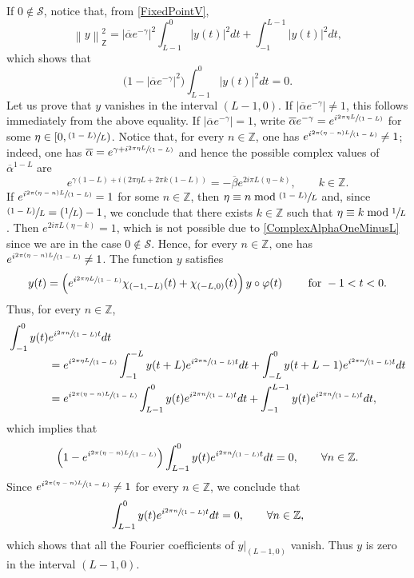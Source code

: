 \documentclass[10pt]{article}
\newcommand{\spfrac}[2]{\sfrac{#1}{(#2)}}
\newcommand{\psfrac}[2]{\sfrac{(#1)}{#2}}
\newcommand{\Psfrac}[2]{(\sfrac{#1}{#2})}
\theoremstyle{plain}
\theoremstyle{definition}
\newcommand{\norm}[1]{\left\lVert #1\right\lVert}
\newcommand{\abs}[1]{\left\lvert #1\right \rvert}
\numberwithin{equation}{section}\numberwithin{figure}{section}\emergencystretch=3em
\begin{document}
If $0 \notin \mathcal S$, notice that, from \eqref{FixedPointV},
\[
\norm{y}_{\mathsf Z}^2 = \abs{\overline\alpha e^{-\gamma}}^2 \int_{L-1}^{0} \abs{y(t)}^2 dt + \int_{-1}^{L - 1} \abs{y(t)}^2 dt,
\]
which shows that
\[
\bigl(1 - \abs{\overline\alpha e^{-\gamma}}^2\bigr) \int_{L-1}^{0} \abs{y(t)}^2 dt = 0.
\]
Let us prove that $y$ vanishes in the interval $(L - 1, 0)$. If $\abs{\overline\alpha e^{-\gamma}} \neq 1$, this follows immediately from the above equality. If $\abs{\overline\alpha e^{-\gamma}} = 1$, write $\overline\alpha e^{-\gamma} = e^{i \spfrac{2\pi\eta L}{1 - L}}$ for some $\eta \in \left[0, \psfrac{1-L}{L}\right)$. Notice that, for every $n \in \mathbb Z$, one has $e^{i \spfrac{2\pi(\eta - n) L}{1 - L}} \neq 1$; indeed, one has $\overline\alpha = e^{\gamma + i \spfrac{2\pi\eta L}{1 - L}}$ and hence the possible complex values of $\overline\alpha^{1-L}$ are
\begin{equation}
\label{ComplexAlphaOneMinusL}
e^{\gamma (1 - L) + i (2\pi\eta L + 2\pi k (1 - L))} = -\overline\beta e^{2 i \pi L (\eta - k)}, \qquad k \in \mathbb Z.
\end{equation}
If $e^{i \spfrac{2\pi(\eta - n) L}{1 - L}} = 1$ for some $n \in \mathbb Z$, then $\eta \equiv n \bmod \psfrac{1-L}{L}$ and, since $\psfrac{1-L}{L} = \Psfrac{1}{L} - 1$, we conclude that there exists $k \in \mathbb Z$ such that $\eta \equiv k \bmod \sfrac{1}{L}$. Then $e^{2 i \pi L (\eta - k)} = 1$, which is not possible due to \eqref{ComplexAlphaOneMinusL} since we are in the case $0 \notin \mathcal S$. Hence, for every $n \in \mathbb Z$, one has $e^{i \spfrac{2\pi(\eta - n) L}{1 - L}} \neq 1$. The function $y$ satisfies
\[
y(t) = \left(e^{i \spfrac{2\pi\eta L}{1 - L}} \chi_{(-1, -L)}(t) + \chi_{(-L, 0)}(t)\right) y \circ \varphi(t) \qquad \text{ for } -1 < t < 0.
\]
Thus, for every $n \in \mathbb Z$,
\begin{align*}
\int_{-1}^0 y(t) &e^{i \spfrac{2 \pi n}{1-L} t} dt\\[-5pt]
 & = e^{i \spfrac{2\pi\eta L}{1 - L}} \int_{-1}^{-L} y(t + L) e^{i \spfrac{2 \pi n}{1-L} t} dt + \int_{-L}^0 y(t + L - 1) e^{i \spfrac{2 \pi n}{1-L} t} dt \\
& = e^{i \spfrac{2\pi(\eta - n) L}{1 - L}} \int_{L-1}^{0} y(t) e^{i \spfrac{2 \pi n}{1-L} t} dt + \int_{-1}^{L - 1} y(t) e^{i \spfrac{2 \pi n}{1-L} t} dt,
\end{align*}
which implies that
\[
\left(1 - e^{i \spfrac{2\pi(\eta - n) L}{1 - L}}\right) \int_{L-1}^{0} y(t) e^{i \spfrac{2 \pi n}{1-L} t} dt = 0, \qquad \forall n \in \mathbb Z.
\]
Since $e^{i \spfrac{2\pi(\eta - n) L}{1 - L}} \neq 1$ for every $n \in \mathbb Z$, we conclude that
\[
\int_{L-1}^{0} y(t) e^{i \spfrac{2 \pi n}{1-L} t} dt = 0, \qquad \forall n \in \mathbb Z,
\]
which shows that all the Fourier coefficients of $y|_{(L-1, 0)}$ vanish. Thus $y$ is zero in the interval $(L-1, 0)$.
\end{document}
